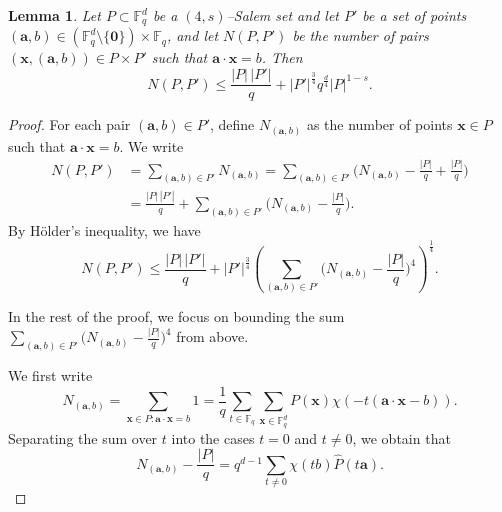 \documentclass[11pt]{article}
\newtheorem{lemma}[theorem]{Lemma}
\newcommand{\Fqd}{\mathbb{F}_q^d}
\begin{document}
\begin{lemma}\label{lm-counting}
    Let $P \subset \Fqd$ be a $(4, s)$--Salem set and let $P'$ be a set of points $(\mathbf{a}, b)\in (\mathbb{F}_q^d\setminus\{\mathbf{0}\})\times \mathbb{F}_q$, and let $N(P, P')$ be the number of pairs $(\mathbf{x}, (\mathbf{a}, b))\in P\times P'$ such that $\mathbf{a}\cdot \mathbf{x}=b$. Then 
\[
N(P, P') \leq \frac{|P| \, |P'|}{q} + |P'|^{\frac{3}{4}} q^{\frac{d}{4}} |P|^{1-s}.
\]
\end{lemma}
\begin{proof}
For each pair $(\mathbf{a}, b)\in P'$, define $N_{(\mathbf{a}, b)}$ as the number of points $\mathbf{x}\in P$ such that $\mathbf{a}\cdot \mathbf{x}=b$.  
    We write 
\begin{align}
    N(P, P')&=\sum_{(\mathbf{a}, b)\in P'}N_{(\mathbf{a}, b)}=\sum_{(\mathbf{a}, b)\in P'} \bigg(N_{(\mathbf{a}, b)}-\frac{|P|}{q}+\frac{|P|}{q} \bigg)\nonumber\\
    &=\frac{|P| \,|P'|}{q}+\sum_{(\mathbf{a}, b)\in P'}\bigg(N_{(\mathbf{a}, b)}-\frac{|P|}{q} \bigg)\nonumber.
    \end{align}
By H\"{o}lder's inequality,  we have   
\begin{equation} \label{incid} N(P, P')\le \frac{|P| \,|P'|}{q}+|P'|^{\frac{3}{4}}\left(\sum_{(\mathbf{a}, b)\in P'} \bigg(N_{(\mathbf{a}, b)}-\frac{|P|}{q} \bigg)^4\right)^{\frac{1}{4}}.\end{equation}

In the rest of the proof, we focus on bounding the sum $\sum_{(\mathbf{a}, b)\in P'} \bigg(N_{(\mathbf{a}, b)}-\frac{|P|}{q} \bigg)^4$ from above. 

We first write
$$ N_{(\mathbf{a}, b)}= \sum_{\mathbf{x}\in P: \mathbf{a}\cdot \mathbf{x}=b} 1= \frac{1}{q} \sum_{t\in \mathbb F_q} \sum_{\mathbf{x}\in \mathbb F_q^d}  P(\mathbf{x}) \chi(-t(\mathbf{a}\cdot \mathbf{x}-b)).$$  
 Separating the sum over $t$ into the cases $t = 0$ and $t \neq 0$, we obtain that 
\[ N_{(\mathbf{a}, b)} - \frac{|P|}{q} = q^{d-1}\sum_{t \neq 0} \chi(tb) \widehat{P}(t\mathbf{a}). \]


\end{proof}
\end{document}
